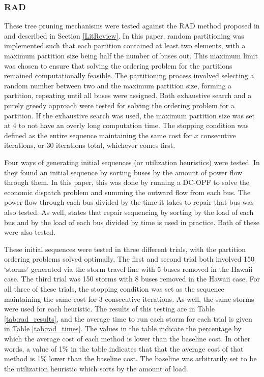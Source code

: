 \documentclass[12pt]{article}
\begin{document}
\subsubsection{RAD}
These tree pruning mechanisms were tested against the RAD method proposed in \cite{coffrin2012} and described in Section \ref{LitReview}. In this paper, random partitioning was implemented such that each partition contained at least two elements, with a maximum partition size being half  the number of buses out. This maximum limit was chosen to ensure that solving the ordering problem for the partitions remained computationally feasible. The partitioning process involved selecting a random number between two and the maximum partition size, forming a partition, repeating until all buses were assigned. Both exhaustive search and a purely greedy approach were tested for solving the ordering problem for a partition. If the exhaustive search was used, the maximum partition size was set at 4 to not have an overly long computation time.  The stopping condition was defined as the entire sequence maintaining the same cost for $x$ consecutive iterations, or 30 iterations total, whichever comes first. \par

Four ways of generating initial sequences (or utilization heuristics) were tested. In \cite{coffrin2012} they found an initial sequence by sorting buses by the amount of power flow through them. In this paper, this was done by running a DC-OPF to solve the economic dispatch problem and summing the outward flow from each bus. The power flow through each bus divided by the time it takes to repair that bus was also tested. As well, \cite{tan} states that repair sequencing by sorting by the load of each bus and by the load of each bus divided by time is used in practice. Both of these were also tested.

These initial sequences were tested in three different trials, with the partition ordering problems solved optimally. The first and second trial both involved 150 `storms' generated via the storm travel line with 5 buses removed in the Hawaii case. The third trial was 150 storms with 8 buses removed in the Hawaii case. For all three of these trials, the stopping condition was set as the sequence maintaining the same cost for 3 consecutive iterations. As well, the same storms were used for each heuristic. The results of this testing are in Table \ref{tab:rad_results}, and the average time to run each storm  for each trial is given in Table \ref{tab:rad_times}. The values in the table indicate the percentage by which the average cost of each method is lower than the baseline cost. In other words, a value of 1\% in the table indicates that that the average cost of that method is 1\% lower than the baseline cost. The baseline  was arbitrarily set to be the utilization heuristic which sorts by the amount of load. 
\end{document}
